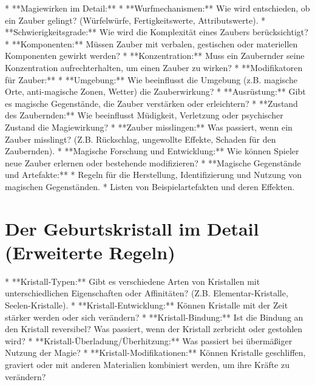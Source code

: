 \documentclass[10pt,a4paper,twocolumn,openany]{book}
\begin{document}
* **Magiewirken im Detail:**
* **Wurfmechanismen:** Wie wird entschieden, ob ein Zauber gelingt? (Würfelwürfe, Fertigkeitswerte, Attributswerte).
* **Schwierigkeitsgrade:** Wie wird die Komplexität eines Zaubers berücksichtigt?
* **Komponenten:** Müssen Zauber mit verbalen, gestischen oder materiellen Komponenten gewirkt werden?
* **Konzentration:** Muss ein Zaubernder seine Konzentration aufrechterhalten, um einen Zauber zu wirken?
* **Modifikatoren für Zauber:**
* **Umgebung:** Wie beeinflusst die Umgebung (z.B. magische Orte, anti-magische Zonen, Wetter) die Zauberwirkung?
* **Ausrüstung:** Gibt es magische Gegenstände, die Zauber verstärken oder erleichtern?
* **Zustand des Zaubernden:** Wie beeinflusst Müdigkeit, Verletzung oder psychischer Zustand die Magiewirkung?
* **Zauber misslingen:** Was passiert, wenn ein Zauber misslingt? (Z.B. Rückschlag, ungewollte Effekte, Schaden für den Zaubernden).
* **Magische Forschung und Entwicklung:** Wie können Spieler neue Zauber erlernen oder bestehende modifizieren?
* **Magische Gegenstände und Artefakte:**
* Regeln für die Herstellung, Identifizierung und Nutzung von magischen Gegenständen.
* Listen von Beispielartefakten und deren Effekten.

\chapter{Der Geburtskristall im Detail (Erweiterte Regeln)}

* **Kristall-Typen:** Gibt es verschiedene Arten von Kristallen mit unterschiedlichen Eigenschaften oder Affinitäten? (Z.B. Elementar-Kristalle, Seelen-Kristalle).
* **Kristall-Entwicklung:** Können Kristalle mit der Zeit stärker werden oder sich verändern?
* **Kristall-Bindung:** Ist die Bindung an den Kristall reversibel? Was passiert, wenn der Kristall zerbricht oder gestohlen wird?
* **Kristall-Überladung/Überhitzung:** Was passiert bei übermäßiger Nutzung der Magie?
* **Kristall-Modifikationen:** Können Kristalle geschliffen, graviert oder mit anderen Materialien kombiniert werden, um ihre Kräfte zu verändern?
\end{document}
